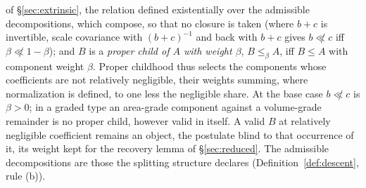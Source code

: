 \begin{defin}
of \S\ref{sec:extrinsic}, the relation defined existentially over the admissible decompositions, which compose, so that no closure is taken (where $b + c$ is invertible, scale covariance with $(b+c)^{-1}$ and back with $b + c$ gives $b \not\ll c$ iff $\beta \not\ll 1 - \beta$); and $B$ is a \emph{proper child of $A$ with weight $\beta$}, $B \le_\beta A$, iff $B \le A$ with component weight $\beta$. Proper childhood thus selects the components whose coefficients are not relatively negligible, their weights summing, where normalization is defined, to one less the negligible share.  At the base case $b \not\ll c$ is $\beta > 0$; in a graded type an area-grade component against a volume-grade remainder is no proper child, however valid in itself. A valid $B$ at relatively negligible coefficient remains an object, the postulate blind to that occurrence of it, its weight kept for the recovery lemma of \S\ref{sec:reduced}. The admissible decompositions are those the splitting structure declares (Definition~\ref{def:descent}, rule (b)).

\end{defin}
